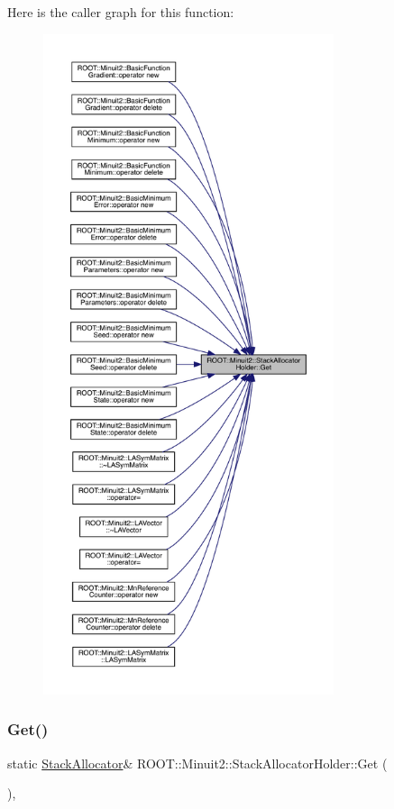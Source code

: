 Here is the caller graph for this function\+:\nopagebreak
\begin{figure}[H]
\begin{center}
\leavevmode
\includegraphics[height=550pt]{d7/d96/classROOT_1_1Minuit2_1_1StackAllocatorHolder_ae380b3ed5065e114b12ac61207542466_icgraph}
\end{center}
\end{figure}
\mbox{\label{classROOT_1_1Minuit2_1_1StackAllocatorHolder_ae380b3ed5065e114b12ac61207542466}} 
\subsubsection{\texorpdfstring{Get()}{Get()}\hspace{0.1cm}{\footnotesize\ttfamily [2/2]}}
{\footnotesize\ttfamily static \mbox{\hyperlink{classROOT_1_1Minuit2_1_1StackAllocator}{Stack\+Allocator}}\& R\+O\+O\+T\+::\+Minuit2\+::\+Stack\+Allocator\+Holder\+::\+Get (\begin{DoxyParamCaption}{ }\end{DoxyParamCaption})\hspace{0.3cm}{\ttfamily [inline]}, {\ttfamily [static]}}



